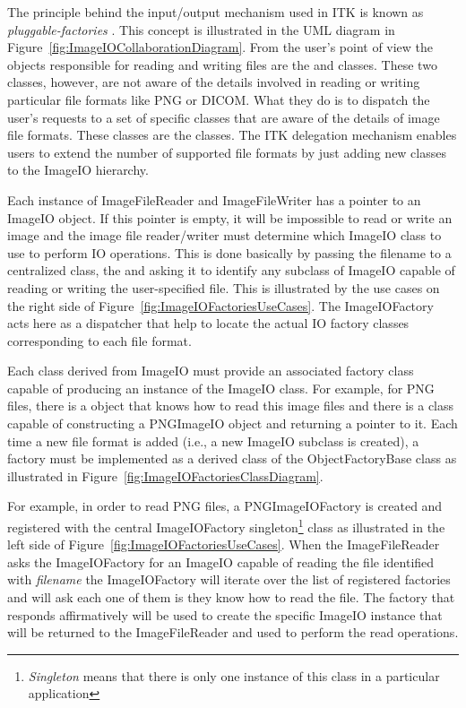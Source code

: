 The principle behind the input/output mechanism used in ITK is known as
\emph{pluggable-factories} \cite{Gamma1995}. This concept is illustrated in
the UML diagram in Figure~\ref{fig:ImageIOCollaborationDiagram}. From the
user's point of view the objects responsible for reading and writing files
are the  and 
classes. These two classes, however, are not aware of the details involved in
reading or writing particular file formats like PNG or DICOM.  What they do
is to dispatch the user's requests to a set of specific classes that are
aware of the details of image file formats. These classes are the
 classes. The ITK delegation mechanism enables users to
extend the number of supported file formats by just adding new classes to the
ImageIO hierarchy.

Each instance of ImageFileReader and ImageFileWriter has
a pointer to an ImageIO object. If this pointer is empty, it will
be impossible to read or write an image and the image file reader/writer must
determine which ImageIO class to use to perform IO operations.
This is done basically by passing the filename to a centralized class, the
 and asking it to identify any subclass of
ImageIO capable of reading or writing the user-specified file. This
is illustrated by the use cases on the right side of
Figure~\ref{fig:ImageIOFactoriesUseCases}. The ImageIOFactory acts here as a
dispatcher that help to locate the actual IO factory classes corresponding to
each file format.

Each class derived from ImageIO must provide an associated factory
class capable of producing an instance of the ImageIO class. For
example, for PNG files, there is a  object that knows how
to read this image files and there is a  class
capable of constructing a PNGImageIO object and returning a pointer
to it.  Each time a new file format is added (i.e., a new ImageIO
subclass is created), a factory must be implemented as a derived class of the
ObjectFactoryBase class as illustrated in
Figure~\ref{fig:ImageIOFactoriesClassDiagram}.

For example, in order to read PNG files, a PNGImageIOFactory is
created and registered with the central ImageIOFactory
singleton\footnote{\emph{Singleton} means that there is only one instance of
this class in a particular application} class as illustrated in the left side
of Figure~\ref{fig:ImageIOFactoriesUseCases}. When the ImageFileReader asks
the ImageIOFactory for an ImageIO capable of reading the
file identified with \emph{filename} the ImageIOFactory will iterate over the
list of registered factories and will ask each one of them is they know how
to read the file. The factory that responds affirmatively will be used to
create the specific ImageIO instance that will be returned to the
ImageFileReader and used to perform the read operations.

